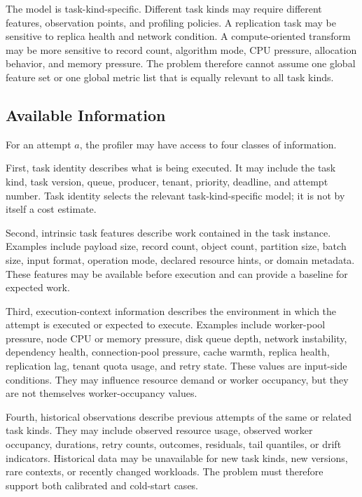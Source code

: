 The model is task-kind-specific. Different task kinds may require different
features, observation points, and profiling policies. A replication task may be
sensitive to replica health and network condition. A compute-oriented transform
may be more sensitive to record count, algorithm mode, CPU pressure, allocation
behavior, and memory pressure. The problem therefore cannot assume one global
feature set or one global metric list that is equally relevant to all task
kinds.

\subsection{Available Information}
\label{sec:problem-available-information}

For an attempt $a$, the profiler may have access to four classes of information.

First, task identity describes what is being executed. It may include the task
kind, task version, queue, producer, tenant, priority, deadline, and attempt
number. Task identity selects the relevant task-kind-specific model; it is not
by itself a cost estimate.

Second, intrinsic task features describe work contained in the task instance.
Examples include payload size, record count, object count, partition size, batch
size, input format, operation mode, declared resource hints, or domain metadata.
These features may be available before execution and can provide a baseline for
expected work.

Third, execution-context information describes the environment in which the
attempt is executed or expected to execute. Examples include worker-pool
pressure, node CPU or memory pressure, disk queue depth, network instability,
dependency health, connection-pool pressure, cache warmth, replica health,
replication lag, tenant quota usage, and retry state. These values are
input-side conditions. They may influence resource demand or worker occupancy,
but they are not themselves worker-occupancy values.

Fourth, historical observations describe previous attempts of the same or
related task kinds. They may include observed resource usage, observed worker
occupancy, durations, retry counts, outcomes, residuals, tail quantiles, or drift
indicators. Historical data may be unavailable for new task kinds, new versions,
rare contexts, or recently changed workloads. The problem must therefore support
both calibrated and cold-start cases.

